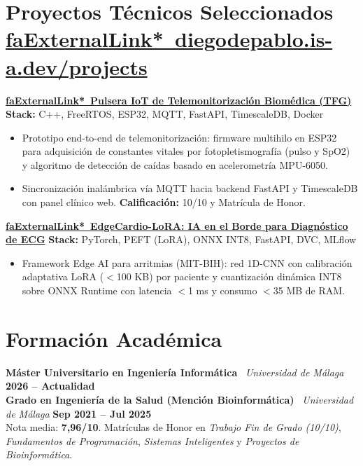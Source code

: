 \documentclass[a4paper,10pt]{article}
\begin{document}
\section*{Proyectos Técnicos Seleccionados \hfill {\normalfont\scriptsize\color{subtext}\href{https://diegodepablo.is-a.dev/projects}{\csname faExternalLink*\endcsname\ diegodepablo.is-a.dev/projects}}}

\noindent\textbf{\href{https://diegodepablo.is-a.dev/projects/tfg-patient-monitoring}{\csname faExternalLink*\endcsname\ Pulsera IoT de Telemonitorización Biomédica (TFG)}} \hfill {\scriptsize\color{subtext}\textbf{Stack:} C++, FreeRTOS, ESP32, MQTT, FastAPI, TimescaleDB, Docker}
\begin{itemize}
  \item Prototipo end-to-end de telemonitorización: firmware multihilo en ESP32 para adquisición de constantes vitales por fotopletismografía (pulso y SpO2) y algoritmo de detección de caídas basado en acelerometría MPU-6050.
  \item Sincronización inalámbrica vía MQTT hacia backend FastAPI y TimescaleDB con panel clínico web. \textbf{Calificación:} 10/10 y Matrícula de Honor.
\end{itemize}

\vspace{4.5pt}

\noindent\textbf{\href{https://diegodepablo.is-a.dev/projects/edgecardio-lora}{\csname faExternalLink*\endcsname\ EdgeCardio-LoRA: IA en el Borde para Diagnóstico de ECG}} \hfill {\scriptsize\color{subtext}\textbf{Stack:} PyTorch, PEFT (LoRA), ONNX INT8, FastAPI, DVC, MLflow}
\begin{itemize}
  \item Framework Edge AI para arritmias (MIT-BIH): red 1D-CNN con calibración adaptativa LoRA ($<$100 KB) por paciente y cuantización dinámica INT8 sobre ONNX Runtime con latencia $<$1 ms y consumo $<$35 MB de RAM.
\end{itemize}

\section*{Formación Académica}

\noindent\textbf{Máster Universitario en Ingeniería Informática} \textbar\ \textit{Universidad de Málaga} \hfill {\footnotesize\color{subtext}\textbf{2026 -- Actualidad}} \\[2.5pt]
\noindent\textbf{Grado en Ingeniería de la Salud (Mención Bioinformática)} \textbar\ \textit{Universidad de Málaga} \hfill {\footnotesize\color{subtext}\textbf{Sep 2021 -- Jul 2025}} \\
{\footnotesize Nota media: \textbf{7,96/10}. Matrículas de Honor en \textit{Trabajo Fin de Grado (10/10)}, \textit{Fundamentos de Programación}, \textit{Sistemas Inteligentes} y \textit{Proyectos de Bioinformática}.}
\end{document}
